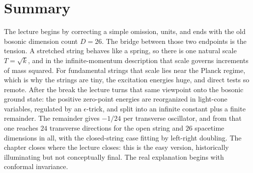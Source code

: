 \section{Summary}

The lecture begins by correcting a simple omission, units, and ends with the old bosonic dimension count \(D=26\). The bridge between those two endpoints is the tension. A stretched string behaves like a spring, so there is one natural scale \(T=\sqrt{k}\), and in the infinite-momentum description that scale governs increments of mass squared. For fundamental strings that scale lies near the Planck regime, which is why the strings are tiny, the excitation energies huge, and direct tests so remote. After the break the lecture turns that same viewpoint onto the bosonic ground state: the positive zero-point energies are reorganized in light-cone variables, regulated by an \(\epsilon\)-trick, and split into an infinite constant plus a finite remainder. The remainder gives \(-1/24\) per transverse oscillator, and from that one reaches \(24\) transverse directions for the open string and \(26\) spacetime dimensions in all, with the closed-string case fitting by left-right doubling. The chapter closes where the lecture closes: this is the easy version, historically illuminating but not conceptually final. The real explanation begins with conformal invariance.